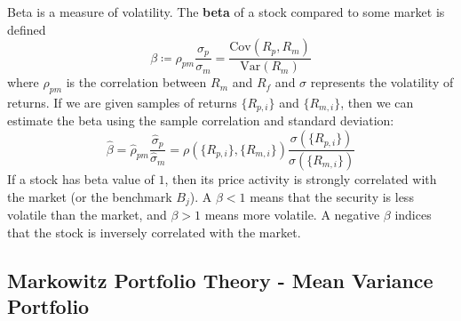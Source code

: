 \documentclass{article}
\begin{document}
  \begin{definition}[Beta]
    Beta is a measure of volatility. The \textbf{beta} of a stock compared to some market is defined 
    \begin{equation}
      \beta \coloneqq \rho_{pm} \frac{\sigma_p}{\sigma_m} = \frac{\mathrm{Cov}(R_p, R_m)}{\mathrm{Var}(R_m)}
    \end{equation}
    where $\rho_{pm}$ is the correlation between $R_m$ and $R_f$ and $\sigma$ represents the volatility of returns. If we are given samples of returns $\{R_{p, i}\}$ and $\{R_{m, i}\}$, then we can estimate the beta using the sample correlation and standard deviation: 
    \begin{equation}
      \hat{\beta} = \hat{\rho}_{pm} \frac{\hat{\sigma}_p}{\hat{\sigma}_m} = \rho(\{R_{p, i}\}, \{R_{m, i}\}) \frac{\sigma(\{R_{p, i}\})}{\sigma(\{R_{m, i}\})} 
    \end{equation}
    If a stock has beta value of $1$, then its price activity is strongly correlated with the market (or the benchmark $B_j$). A $\beta < 1$ means that the security is less volatile than the market, and $\beta > 1$ means more volatile. A negative $\beta$ indices that the stock is inversely correlated with the market. 
  \end{definition}

  \subsection{Markowitz Portfolio Theory - Mean Variance Portfolio}
\end{document}
